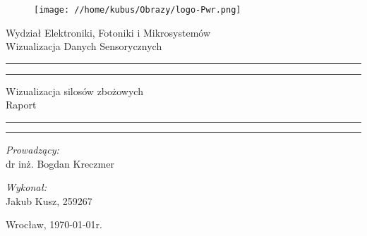 \begin{titlepage}
\begin{figure}
	\centering
	\texttt{[image: //home/kubus/Obrazy/logo-Pwr.png]}
	
	\label{fig:pwr}
\end{figure}
	\begin{center}
		\huge Wydział Elektroniki, Fotoniki i Mikrosystemów \\ 
		\vspace{40pt}
		\huge Wizualizacja Danych Sensorycznych  \\
	\end{center}
	\vspace{60pt}
	\hrule
	\vspace{1pt}
	\hrule
	\begin{center}
		{\fontsize{40}{40}\selectfont Wizualizacja silosów zbożowych\\ }
		\vspace{10pt}
		{\fontsize{35}{35}\selectfont Raport  }
	\end{center}
	\hrule
	\vspace{1pt}
	\hrule
	\begin{flushright}
		\vspace{65pt}
		\textit{\Large Prowadzący:}\\
		
		\Large dr inż. Bogdan Kreczmer\\
	\end{flushright}
		\vspace{10pt}
		\begin{flushleft}
			\textit{\Large Wykonał:}\\
		
			\Large Jakub Kusz, 259267 \\	
		\end{flushleft}
	
	
	\vspace{100pt}
	\begin{center}
		\large Wrocław, \today r.
	\end{center}
\end{titlepage}


